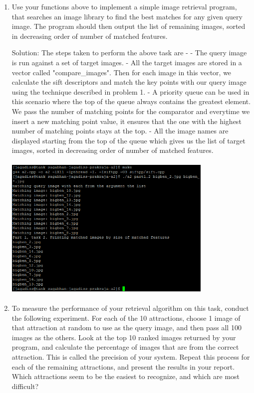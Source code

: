 \documentclass{article}
\begin{document}
\begin{enumerate}
		\item Use your functions above to implement a simple image retrieval program, that searches an image library to find the best matches for any given query image. The program should then output the list of remaining images, sorted in decreasing order of number of matched features. 
		
		Solution: The steps taken to perform the above task are - \newline
		- The query image is run against a set of target images. \newline
		- All the target images are stored in a vector called "compare\_images". Then for each image in this vector, we calculate the sift descriptors and match the key points with our query image using the technique described in problem 1. \newline
		- A priority queue can be used in this scenario where the top of the queue always contains the greatest element. We pass the number of matching points for the comparator and everytime we insert a new matching point value, it ensures that the one with the highest number of matching points stays at the top. \newline
		- All the image names are displayed starting from the top of the queue which gives us the list of target images, sorted in decreasing order of number of matched features.
			\begin{center}
				\includegraphics[width=10cm, height=7cm]{p1-q2.png} \\
			\end{center}
		
		\item To measure the performance of your retrieval algorithm on this task, conduct the following experiment. For each of the 10 attractions, choose 1 image of that attraction at random to use as the query image, and then pass all 100 images as the others. Look at the top 10 ranked images returned by your program, and calculate the percentage
		of images that are from the correct attraction. This is called the precision of your system. Repeat this	process for each of the remaining attractions, and present the results in your report. Which attractions seem to be the easiest to recognize, and which are most difficult? 
		

\end{enumerate}
\end{document}

